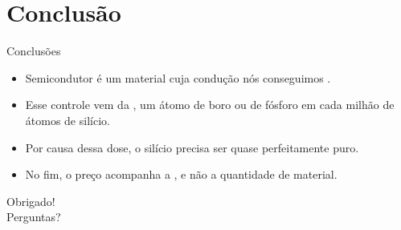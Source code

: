 \section*{Conclusão}

\begin{frame}{Conclusões}
  \begin{itemize}
    \item Semicondutor é um material cuja condução nós conseguimos
          .
    \item Esse controle vem da , um átomo de boro ou de
          fósforo em cada milhão de átomos de silício.
    \item Por causa dessa dose, o silício precisa ser quase perfeitamente
          puro.
    \item No fim, o preço acompanha a , e não a quantidade de
          material.
  \end{itemize}
\end{frame}

\begin{frame}[plain]
  \vfill
  \centering
  {\Large Obrigado! \\[0.3cm] Perguntas?}
  \vfill
\end{frame}
